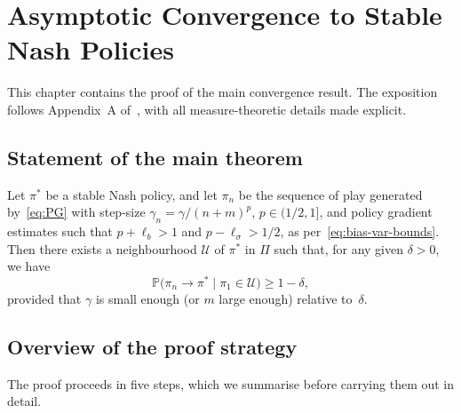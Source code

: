 \documentclass[a4paper,oneside,11pt]{report}
\newcommand{\Prob}{\mathbb{P}}
\newcommand{\calU}{\mathcal{U}}
\numberwithin{theorem}{chapter}
\numberwithin{equation}{chapter}
\begin{document}
\chapter{Asymptotic Convergence to Stable Nash Policies}
\label{ch:proof}

This chapter contains the proof of the main convergence result. The
exposition follows Appendix~A of~\cite{giannou2022}, with all
measure-theoretic details made explicit.

\section{Statement of the main theorem}
\label{sec:thm-statement}

\begin{theorem}
  \label{thm:main}
  Let\/ $\pi^*$ be a stable Nash policy, and let $\pi_n$ be the
  sequence of play generated by~\eqref{eq:PG} with step-size
  $\gamma_n = \gamma/(n+m)^p$, $p \in (1/2, 1]$, and policy gradient
  estimates such that $p + \ell_b > 1$ and
  $p - \ell_\sigma > 1/2$, as per~\eqref{eq:bias-var-bounds}. Then
  there exists a neighbourhood $\calU$ of\/ $\pi^*$ in $\Pi$ such that,
  for any given $\delta > 0$, we have
  \begin{equation}
    \label{eq:thm-main}
    \Prob\bigl(\pi_n \to \pi^* \mid \pi_1 \in \calU\bigr)
    \ge 1 - \delta,
  \end{equation}
  provided that $\gamma$ is small enough (or $m$ large enough) relative
  to~$\delta$.
\end{theorem}

\section{Overview of the proof strategy}
\label{sec:proof-overview}

The proof proceeds in five steps, which we summarise before carrying
them out in detail.
\end{document}
